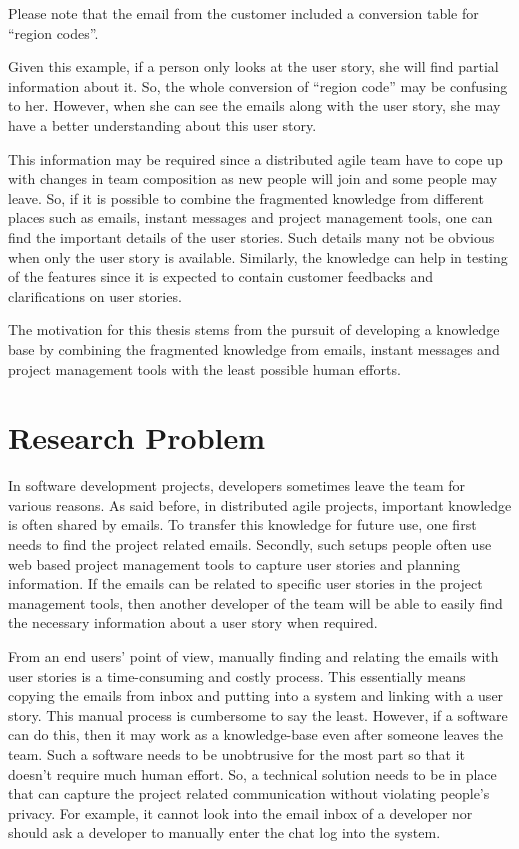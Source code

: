 Please note that the email from the customer included a conversion table for ``region codes''. 

Given this example, if a person only looks at the user story, she will find partial information about it. So, the whole conversion of ``region code''  may be confusing to her. However, when she can see the emails along with the user story, she may have a better understanding about this user story.

This information may be required since a distributed agile team have to cope up with changes in team composition as new people will join and some people may leave. So, if it is possible to combine the fragmented knowledge from different places such as emails, instant messages and project management tools, one can find the important details of the user stories. Such details many not be obvious when only the user story is available. Similarly, the knowledge can help in testing of the features since it is expected to contain customer feedbacks and clarifications on user stories.

The motivation for this thesis stems from the pursuit of developing a knowledge base by combining the fragmented knowledge from emails, instant messages and project management tools with the least possible human efforts.

\section{Research Problem}
In software development projects, developers sometimes leave the team for various reasons. As said before, in distributed agile projects, important knowledge is often shared by emails. To transfer this knowledge for future use, one first needs to find the project related emails. Secondly, such setups people often use web based project management tools to capture user stories and planning information. If the emails can be related to specific user stories in the project management tools, then another developer of the team will be able to easily find the necessary information about a user story when required.

From an end users' point of view, manually finding and relating the emails with user stories is a time-consuming and costly process. This essentially means copying the emails from inbox and putting into a system and linking with a user story. This manual process is cumbersome to say the least. However, if a software can do this, then it may work as a knowledge-base even after someone leaves the team. Such a software needs to be unobtrusive for the most part so that it doesn't require much human effort. So, a technical solution needs to be in place that can capture the project related communication without violating people's privacy. For example, it cannot look into the email inbox of a developer nor should ask a developer to manually enter the chat log into the system.  

